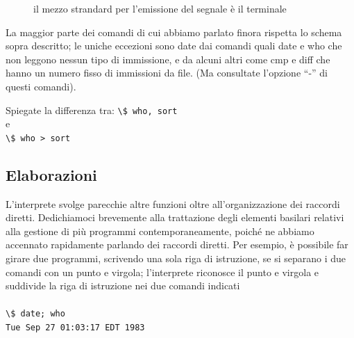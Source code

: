 \begin{figure}[!ht]
	\centering
	\caption{il mezzo strandard per l'emissione del segnale è il terminale}
\end{figure}


La maggior parte dei comandi di cui abbiamo parlato finora rispetta lo schema sopra
descritto; le uniche eccezioni sono date dai comandi quali date e who che non leggono
nessun tipo di immissione, e da alcuni altri come cmp e diff che hanno un numero fisso
di immissioni da file. (Ma consultate l'opzione ``-'' di questi comandi).
\begin{eser}
	Spiegate la differenza tra:
	\lstinline|\$ who, sort|\\
	e\\
	\lstinline|\$ who > sort|
\end{eser}
\subsection{Elaborazioni}
L'interprete svolge parecchie altre funzioni oltre all'organizzazione dei raccordi diretti. Dedichiamoci brevemente alla trattazione degli elementi basilari relativi alla gestione di più programmi contemporaneamente, poiché ne abbiamo accennato rapidamente parlando dei raccordi diretti. Per esempio, è possibile far girare due programmi, scrivendo una sola riga di istruzione, se si separano i due comandi con un punto e
virgola; l'interprete riconosce il punto e virgola e suddivide la riga di istruzione nei due comandi indicati\\\\
\lstinline|\$ date; who|\\
\texttt{Tue Sep 27 01:03:17 EDT 1983}
